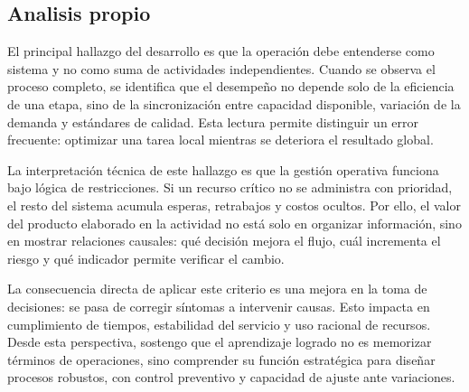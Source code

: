 \documentclass[
	spanish,
	letterpaper, oneside
]{article}
\begin{document}
%

\subsection{Analisis propio}

El principal hallazgo del desarrollo es que la operación debe entenderse como sistema y no como suma de actividades independientes. Cuando se observa el proceso completo, se identifica que el desempeño no depende solo de la eficiencia de una etapa, sino de la sincronización entre capacidad disponible, variación de la demanda y estándares de calidad. Esta lectura permite distinguir un error frecuente: optimizar una tarea local mientras se deteriora el resultado global.

La interpretación técnica de este hallazgo es que la gestión operativa funciona bajo lógica de restricciones. Si un recurso crítico no se administra con prioridad, el resto del sistema acumula esperas, retrabajos y costos ocultos. Por ello, el valor del producto elaborado en la actividad no está solo en organizar información, sino en mostrar relaciones causales: qué decisión mejora el flujo, cuál incrementa el riesgo y qué indicador permite verificar el cambio.

La consecuencia directa de aplicar este criterio es una mejora en la toma de decisiones: se pasa de corregir síntomas a intervenir causas. Esto impacta en cumplimiento de tiempos, estabilidad del servicio y uso racional de recursos. Desde esta perspectiva, sostengo que el aprendizaje logrado no es memorizar términos de operaciones, sino comprender su función estratégica para diseñar procesos robustos, con control preventivo y capacidad de ajuste ante variaciones.
\end{document}
